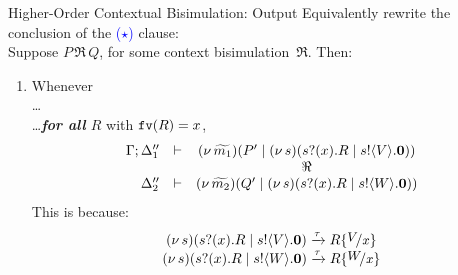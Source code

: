 \documentclass{beamer}
\begin{document}
	\begin{frame}{Higher-Order Contextual Bisimulation: Output}
		Equivalently rewrite the conclusion of the \textcolor{blue}{($\star$)} clause:
		\\[2mm]

		Suppose $P \,\Re\, Q$, for some context bisimulation~$\Re$. Then:
		\begin{enumerate}[$(\star)$]
			\item	Whenever\\
				\dots\\
				\dots \emph{\textbf{for all} $R$}  with $\mathtt{fv}(R)=x$, 
				\[
					\begin{array}{rcc}
						\Gamma; \Delta_1'' &\vdash& (\nu\, \widetilde{m_1})(P' \;|\; (\nu\, s)(s ? (x) . R \;|\;  s ! \langle V \rangle . \mathbf{0}))
						\\
						&&\Re
						\\
						\Delta_2'' &\vdash&  (\nu\, \widetilde{m_2})(Q' \;|\; (\nu\, s)(s ? (x) . R \;|\; s ! \langle W \rangle . \mathbf{0}))
					\end{array}
				\]
				This is because:
				\[
					\begin{array}{c}
						\newsp{s}{\binp{s}{x} R \Par \bout{s}{V} \inact}
						\by{\tau}
						R \subst{V}{x}
						\\
						\newsp{s}{\binp{s}{x} R \Par \bout{s}{W} \inact}
						\by{\tau}
						R \subst{W}{x}
					\end{array}
				\]
		\end{enumerate}
	\end{frame}
\end{document}
